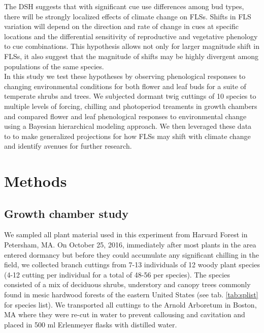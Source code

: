 \documentclass[11pt]{article}
\begin{document}
\noindent The DSH suggests that with significant cue use differences among bud types, there will be strongly localized effects of climate change on FLSs. Shifts in FLS variation will depend on the direction and rate of change in cues at specific locations and the differential sensitivity of reproductive and vegetative phenology to cue combinations. This hypothesis allows not only for larger magnitude shift in FLSs, it also suggest that the magnitude of shifts may be highly divergent among populations of the same species.\\


\noindent In this study we test these hypotheses by observing phenological responses to changing environmental conditions for both flower and leaf buds for a suite of temperate shrubs and trees. We subjected dormant twig cuttings of 10 species to multiple levels of forcing, chilling and photoperiod treaments in growth chambers and compared flower and leaf phenological responses to environmental change using a Bayesian hierarchical modeling approach. We then leveraged these data to to make generalized projections for how FLSs may shift with climate change and identify avenues for further research.\\ 

\section*{Methods}

\subsection*{Growth chamber study}
\noindent We sampled all plant material used in this experiment from Harvard Forest in Petersham, MA. On October 25, 2016, immediately after most plants in the area entered dormancy but before they could accumulate any significant chilling in the field,  we collected branch cuttings from 7-13 individuals of 12 woody plant species (4-12 cutting per individual for a total of 48-56 per species). The species consisted of a mix of deciduous shrubs, understory and canopy trees commonly found in mesic hardwood forests of the eastern United States (see tab. \ref{tab:splist} for species list). We transported all cuttings to the Arnold Arboretum in Boston, MA where they were re-cut in water to prevent callousing and cavitation and placed in 500 ml Erlenmeyer flasks with distilled water.\\ 
\end{document}
